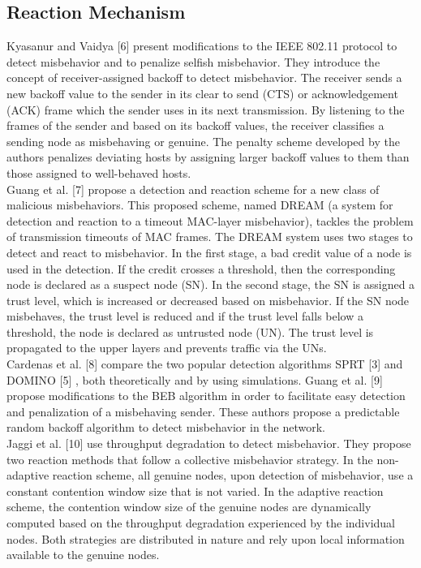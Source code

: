 \documentclass[12pt,letterpaper,english]{article}
\begin{document}
\subsection{Reaction Mechanism}
\indent Kyasanur and Vaidya 
[6] 
present modifications to the IEEE 802.11 protocol to detect misbehavior and to penalize selfish misbehavior. They introduce the concept of receiver-assigned backoff to detect misbehavior. The receiver sends a new backoff value to the sender in its clear to send (CTS) or acknowledgement (ACK) frame which the sender uses in its next transmission. By listening to the frames of the sender and based on its backoff values, the receiver classifies a sending node as misbehaving or genuine. The penalty scheme developed by the authors penalizes deviating hosts by assigning larger backoff values to them than those assigned to well-behaved hosts.
\\
\indent Guang et al. 
[7] 
propose a detection and reaction scheme for a new class of malicious misbehaviors. This proposed scheme, named DREAM (a system for detection and reaction to a timeout MAC-layer misbehavior), tackles the problem of transmission timeouts of MAC frames. The DREAM system uses two stages to detect and react to misbehavior. In the first stage, a bad credit value of a node is used in the detection. If the credit crosses a threshold, then the corresponding node is declared as a suspect node (SN). In the second stage, the SN is assigned a trust level, which is increased or decreased based on misbehavior. If the SN node misbehaves, the trust level is reduced and if the trust level falls below a threshold, the node is declared as untrusted node (UN). The trust level is propagated to the upper layers and prevents traffic via the UNs.
\\
\indent Cardenas et al. 
[8] 
compare the two popular detection algorithms SPRT 
[3] 
and DOMINO 
[5] 
, both theoretically and by using simulations.
Guang et al. 
[9] 
propose modifications to the BEB algorithm in order to facilitate easy detection and penalization of a misbehaving sender. These authors propose a predictable random backoff algorithm to detect misbehavior in the network.
\\
\indent Jaggi et al. 
[10] 
use throughput degradation to detect misbehavior. They propose two reaction methods that follow a collective misbehavior strategy. In the non-adaptive reaction scheme, all genuine nodes, upon detection of misbehavior, use a constant contention window size that is not varied. In the adaptive reaction scheme, the contention window size of the genuine nodes are dynamically computed based on the throughput degradation experienced by the individual nodes. Both strategies are distributed in nature and rely upon local information available to the genuine nodes.
\end{document}
